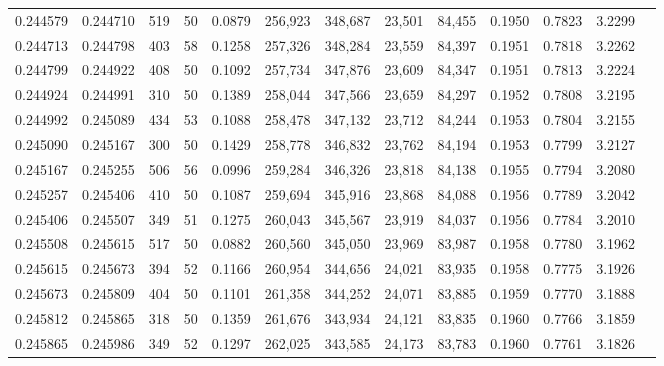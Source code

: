 \begin{tabular}{rrrrrrrrrrrrr}
0.244579 & 0.244710 &   519 &  50 &                                     0.0879 & 256,923 & 348,687 &  23,501 &  84,455 & 0.1950 & 0.7823 & 3.2299 \\
0.244713 & 0.244798 &   403 &  58 &                                     0.1258 & 257,326 & 348,284 &  23,559 &  84,397 & 0.1951 & 0.7818 & 3.2262 \\
0.244799 & 0.244922 &   408 &  50 &                                     0.1092 & 257,734 & 347,876 &  23,609 &  84,347 & 0.1951 & 0.7813 & 3.2224 \\
0.244924 & 0.244991 &   310 &  50 &                                     0.1389 & 258,044 & 347,566 &  23,659 &  84,297 & 0.1952 & 0.7808 & 3.2195 \\
0.244992 & 0.245089 &   434 &  53 &                                     0.1088 & 258,478 & 347,132 &  23,712 &  84,244 & 0.1953 & 0.7804 & 3.2155 \\
0.245090 & 0.245167 &   300 &  50 &                                     0.1429 & 258,778 & 346,832 &  23,762 &  84,194 & 0.1953 & 0.7799 & 3.2127 \\
0.245167 & 0.245255 &   506 &  56 &                                     0.0996 & 259,284 & 346,326 &  23,818 &  84,138 & 0.1955 & 0.7794 & 3.2080 \\
0.245257 & 0.245406 &   410 &  50 &                                     0.1087 & 259,694 & 345,916 &  23,868 &  84,088 & 0.1956 & 0.7789 & 3.2042 \\
0.245406 & 0.245507 &   349 &  51 &                                     0.1275 & 260,043 & 345,567 &  23,919 &  84,037 & 0.1956 & 0.7784 & 3.2010 \\
0.245508 & 0.245615 &   517 &  50 &                                     0.0882 & 260,560 & 345,050 &  23,969 &  83,987 & 0.1958 & 0.7780 & 3.1962 \\
0.245615 & 0.245673 &   394 &  52 &                                     0.1166 & 260,954 & 344,656 &  24,021 &  83,935 & 0.1958 & 0.7775 & 3.1926 \\
0.245673 & 0.245809 &   404 &  50 &                                     0.1101 & 261,358 & 344,252 &  24,071 &  83,885 & 0.1959 & 0.7770 & 3.1888 \\
0.245812 & 0.245865 &   318 &  50 &                                     0.1359 & 261,676 & 343,934 &  24,121 &  83,835 & 0.1960 & 0.7766 & 3.1859 \\
0.245865 & 0.245986 &   349 &  52 &                                     0.1297 & 262,025 & 343,585 &  24,173 &  83,783 & 0.1960 & 0.7761 & 3.1826 \\

\end{tabular}
